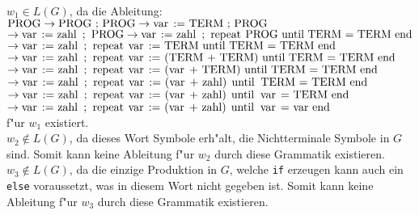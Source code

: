 \documentclass[a4paper,12pt]{article}
\begin{document}

$ w_1 \in L(G) $, da die Ableitung: \\
$ \text{\lstinline|PROG|} \rightarrow \text{\lstinline|PROG ; PROG|} \rightarrow \text{\lstinline|var := TERM ; PROG|} $ \\
$ \rightarrow \text{\lstinline|var := zahl ; PROG|} \rightarrow \text{\lstinline|var := zahl ; repeat PROG until TERM = TERM end|} $ \\
$ \rightarrow \text{\lstinline|var := zahl ; repeat var := TERM until TERM = TERM end |} $ \\
$ \rightarrow \text{\lstinline|var := zahl ; repeat var := (TERM + TERM) until TERM = TERM end |}  $ \\
$ \rightarrow \text{\lstinline|var := zahl ; repeat var := (var + TERM) until TERM = TERM end |}  $ \\
$ \rightarrow \text{\lstinline|var := zahl ; repeat var := (var + zahl) until TERM = TERM end |}  $ \\
$ \rightarrow \text{\lstinline|var := zahl ; repeat var := (var + zahl) until var = TERM end |}  $ \\
$ \rightarrow \text{\lstinline|var := zahl ; repeat var := (var + zahl) until var = var end |}  $ \\
f"ur $ w_1 $ existiert. \\ 

$ w_2 \notin L(G) $, da dieses Wort Symbole erh"alt, die Nichtterminale Symbole in  $ G $ sind. 
Somit kann keine Ableitung f"ur $ w_2 $ durch diese Grammatik existieren. \\

$ w_3 \notin L(G) $, da die einzige Produktion in $ G $, welche \lstinline|if| erzeugen kann auch ein \lstinline|else| voraussetzt, was in diesem Wort nicht gegeben ist.
Somit kann keine Ableitung f"ur $ w_3 $ durch diese Grammatik existieren. \\
\end{document}
